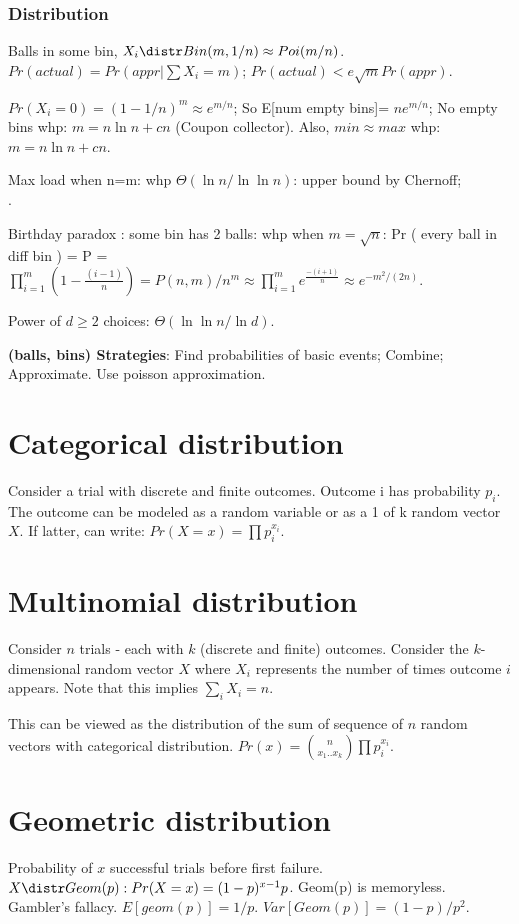 \documentclass[oneside, article]{memoir}
\begin{document}
\subsubsection{Distribution}
Balls in some bin, $X_{i} \distr Bin(m,1/n) \approx Poi(m/n)$. \\
$Pr(actual) =Pr(appr|\sum X_{i}=m)$; $Pr(actual) < e\sqrt{m}Pr(appr)$.

$Pr(X_{i} = 0) = (1-1/n)^{m} \approx e^{m/n}$; So E[num empty bins]= $ne^{m/n}$; No empty bins whp: $m=n \ln n + cn$ (Coupon collector). Also, $min \approx max$ whp: $m=n \ln n + cn$. \why

Max load when n=m: whp $\Theta(\ln n/\ln\ln n)$: upper bound by Chernoff; \\
\tbc.

Birthday paradox : some bin has 2 balls: whp when $m=\sqrt{n}$: Pr ( every ball in diff bin ) = P = $\prod_{i=1}^{m} (1-\frac{(i-1)}{n}) = P(n,m)/n^{m} \approx \prod_{i=1}^{m} e^{\frac{-(i+1)}{n}} \approx e^{-m^{2}/(2n)}$.

Power of $d\geq 2$ choices: $\Theta(\ln\ln n/\ln d)$. \why

\textbf{(balls, bins) Strategies}: Find probabilities of basic events; Combine; Approximate. Use poisson approximation.


\section{Categorical distribution}
Consider a trial with discrete and finite outcomes. Outcome i has probability $p_{i}$. The outcome can be modeled as a random variable or as a 1 of k random vector $X$. If latter, can write: $Pr(X = x) = \prod p_{i}^{x_{i}}$.

\section{Multinomial distribution}
Consider $n$ trials - each with $k$ (discrete and finite) outcomes. Consider the $k$-dimensional random vector $X$ where $X_i$ represents the number of times outcome $i$ appears. Note that this implies $\sum_i X_i = n$.

This can be viewed as the distribution of the sum of sequence of $n$ random vectors with categorical distribution. $Pr(x) = \binom{n}{x_{1}..x_{k}} \prod p_{i}^{x_{i}}$.

\section{Geometric distribution}
Probability of $x$ successful trials before first failure. $X \distr Geom(p): Pr(X=x) = (1-p)^{x-1}p$. Geom(p) is memoryless. Gambler's fallacy. $E[geom(p)]=1/p$. $Var[Geom(p)]=(1-p)/p^{2}$.
\end{document}
